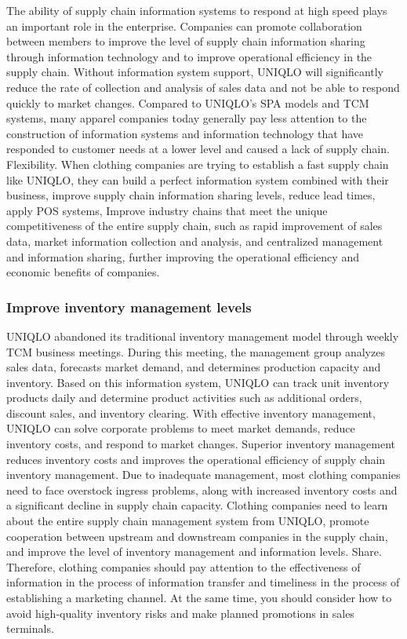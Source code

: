 \documentclass[12pt,]{article}
\begin{document}
The ability of supply chain information systems to respond at high speed
plays an important role in the enterprise. Companies can promote
collaboration between members to improve the level of supply chain
information sharing through information technology and to improve
operational efficiency in the supply chain. Without information system
support, UNIQLO will significantly reduce the rate of collection and
analysis of sales data and not be able to respond quickly to market
changes. Compared to UNIQLO's SPA models and TCM systems, many apparel
companies today generally pay less attention to the construction of
information systems and information technology that have responded to
customer needs at a lower level and caused a lack of supply chain.
Flexibility. When clothing companies are trying to establish a fast
supply chain like UNIQLO, they can build a perfect information system
combined with their business, improve supply chain information sharing
levels, reduce lead times, apply POS systems, Improve industry chains
that meet the unique competitiveness of the entire supply chain, such as
rapid improvement of sales data, market information collection and
analysis, and centralized management and information sharing, further
improving the operational efficiency and economic benefits of companies.

\hypertarget{improve-inventory-management-levels}{%
\subsubsection{Improve inventory management
levels}\label{improve-inventory-management-levels}}

UNIQLO abandoned its traditional inventory management model through
weekly TCM business meetings. During this meeting, the management group
analyzes sales data, forecasts market demand, and determines production
capacity and inventory. Based on this information system, UNIQLO can
track unit inventory products daily and determine product activities
such as additional orders, discount sales, and inventory clearing. With
effective inventory management, UNIQLO can solve corporate problems to
meet market demands, reduce inventory costs, and respond to market
changes. Superior inventory management reduces inventory costs and
improves the operational efficiency of supply chain inventory
management. Due to inadequate management, most clothing companies need
to face overstock ingress problems, along with increased inventory costs
and a significant decline in supply chain capacity. Clothing companies
need to learn about the entire supply chain management system from
UNIQLO, promote cooperation between upstream and downstream companies in
the supply chain, and improve the level of inventory management and
information levels. Share. Therefore, clothing companies should pay
attention to the effectiveness of information in the process of
information transfer and timeliness in the process of establishing a
marketing channel. At the same time, you should consider how to avoid
high-quality inventory risks and make planned promotions in sales
terminals.
\end{document}
